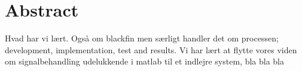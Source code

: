 \chapter{Abstract}
Hvad har vi lært. Også om blackfin men særligt handler det om processen; development, implementation, test and results. Vi har lært at flytte vores viden om signalbehandling udelukkende i matlab til et indlejre system, bla bla bla